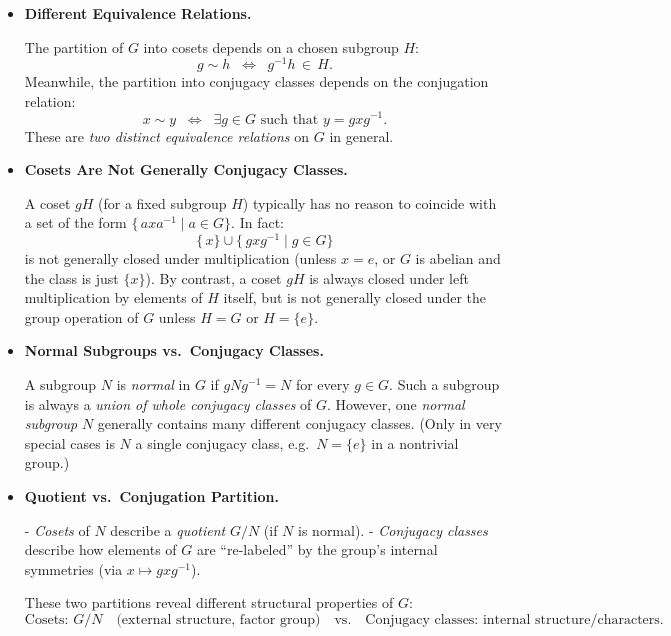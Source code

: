 \documentclass[12pt]{article}
\theoremstyle{definition} %
\theoremstyle{plain} %
\begin{document}
\begin{itemize}
    \item \textbf{Different Equivalence Relations.} 

    The partition of $G$ into cosets depends on a chosen subgroup $H$:
    \[
    g \sim h \;\;\Longleftrightarrow\;\; g^{-1}h \,\in\, H.
    \]
    Meanwhile, the partition into conjugacy classes depends on the conjugation relation:
    \[
    x \sim y \;\;\Longleftrightarrow\;\; \exists g\in G\text{ such that }y = g x g^{-1}.
    \]
    These are \emph{two distinct equivalence relations} on $G$ in general.

    \item \textbf{Cosets Are Not Generally Conjugacy Classes.}

    A coset $gH$ (for a fixed subgroup $H$) typically has no reason to coincide with a set of the form $\{\,a x a^{-1}\mid a \in G\}$.  In fact:
    \[
    \{\,x\}\cup\{\,g x g^{-1}\mid g\in G\}
    \]
    is not generally closed under multiplication (unless $x=e$, or $G$ is abelian and the class is just $\{x\}$).  By contrast, a coset $gH$ is always closed under left multiplication by elements of $H$ itself, but is not generally closed under the group operation of $G$ unless $H=G$ or $H = \{e\}$.

    \item \textbf{Normal Subgroups vs.\ Conjugacy Classes.}

    A subgroup $N$ is \emph{normal} in $G$ if $gNg^{-1} = N$ for every $g\in G$.  Such a subgroup is always a \emph{union of whole conjugacy classes} of $G$.  However, one \emph{normal subgroup} $N$ generally contains many different conjugacy classes.  (Only in very special cases is $N$ a single conjugacy class, e.g.\ $N=\{e\}$ in a nontrivial group.)

    \item \textbf{Quotient vs.\ Conjugation Partition.}

    - \emph{Cosets} of $N$ describe a \emph{quotient} $G/N$ (if $N$ is normal).
    - \emph{Conjugacy classes} describe how elements of $G$ are “re-labeled” by the group’s internal symmetries (via $x \mapsto g x g^{-1}$).  

    These two partitions reveal different structural properties of $G$:
    \[
    \text{Cosets: }G/N \quad\text{(external structure, factor group)}
    \quad\text{vs.}\quad
    \text{Conjugacy classes:  internal structure/characters.}
    \]
\end{itemize}
\end{document}
